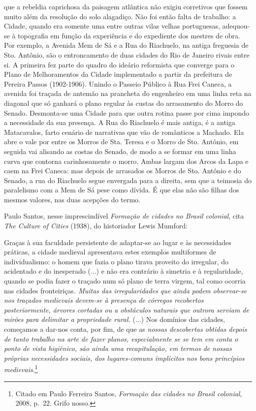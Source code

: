 que a rebeldia caprichosa da paisagem atlântica não exigiu corretivos
que fossem muito além da resolução do solo alagadiço. Não foi então
falta de trabalho: a Cidade, quando era somente uma entre outras vilas
velhas portuguesas, adequou-se à topografia em função da experiência e
do expediente dos mestres de obra. Por exemplo, a Avenida Mem de Sá e a
Rua do Riachuelo, na antiga freguesia de Sto. Antônio, são o
entroncamento de duas cidades do Rio de Janeiro rivais entre si. A
primeira fez parte do quadro do ideário reformista que converge para o
Plano de Melhoramentos da Cidade implementado a partir da prefeitura de
Pereira Passos (1902-1906). Unindo o Passeio Público à Rua Frei Caneca,
a avenida foi traçada de antemão na prancheta do engenheiro em uma linha
reta na diagonal que só ganhará o plano regular às custas do arrasamento
do Morro do Senado. Desmonta-se uma Cidade para que outra rotina passe
por cima impondo a necessidade da sua presença. A Rua do Riachuelo é
mais antiga, é a antiga Matacavalos, farto cenário de narrativas que vão
de românticos a Machado. Ela abre o vale por entre os Morros de Sta.
Teresa e o Morro de Sto. Antônio, em seguida vai alisando as costas do
Senado, de modo a se formar em uma linha curva que contorna
carinhosamente o morro. Ambas largam dos Arcos da Lapa e caem na Frei
Caneca: mas depois de arrasados os Morros de Sto. Antônio e do Senado, a
rua do Riachuelo segue envergada para a direita, sem que a teimosia do
paralelismo com a Mem de Sá pese como dívida. É que elas não são filhas
dos mesmos valores, nas duas acepções do termo.

Paulo Santos, nesse imprescindível \emph{Formação de cidades no Brasil
colonial}, cita \emph{The Culture of Cities} (1938), do historiador
Lewis Mumford:

Graças à sua faculdade persistente de adaptar-se ao lugar e às
necessidades práticas, a cidade medieval apresentava estes exemplos
multiformes de individualismo: o homem que fazia o plano tirava proveito
do irregular, do acidentado e do inesperado (...) e não era contrário à
simetria e à regularidade, quando se podia fazer o traçado num só plano
de terra virgem, tal como ocorria nas cidades fronteiriças\emph{. Muitas
das irregularidades que ainda podem observar-se nos traçados medievais
devem-se à presença de córregos recobertos posteriormente, árvores
cortadas ou a obstáculos naturais que outrora serviam de mirões para
delimitar a propriedade rural.} (...) Nos domínios das cidades,
começamos a dar-nos conta, por fim, de que as \emph{nossas descobertas
obtidas depois de tanto trabalho na arte de fazer planos, especialmente
se se tem em conta o ponto de vista higiênico, são ainda uma
recapitulação, em termos de nossas próprias necessidades sociais, dos
lugares-comuns implícitos nos bons princípios medievais}.\footnote{Citado
  em Paulo Ferreira Santos, \emph{Formação das cidades no Brasil
  colonial}, 2008, p.~22. Grifo nosso.}

